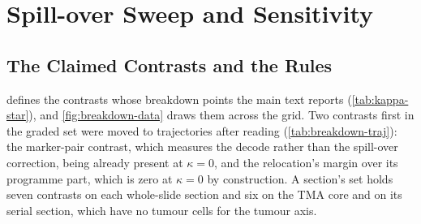 \section{Spill-over Sweep and Sensitivity}
\label{app:sensitivity-section}

\subsection{The Claimed Contrasts and the Rules}
\label{app:sweep}

 defines the contrasts whose breakdown points the main text reports (\cref{tab:kappa-star}), and \cref{fig:breakdown-data} draws them across the grid. Two contrasts first in the graded set were moved to trajectories after reading (\cref{tab:breakdown-traj}): the marker-pair contrast, which measures the decode rather than the spill-over correction, being already present at $\kappa = 0$, and the relocation's margin over its programme part, which is zero at $\kappa = 0$ by construction. A section's set holds seven contrasts on each whole-slide section and six on the TMA core and on its serial section, which have no tumour cells for the tumour axis.

